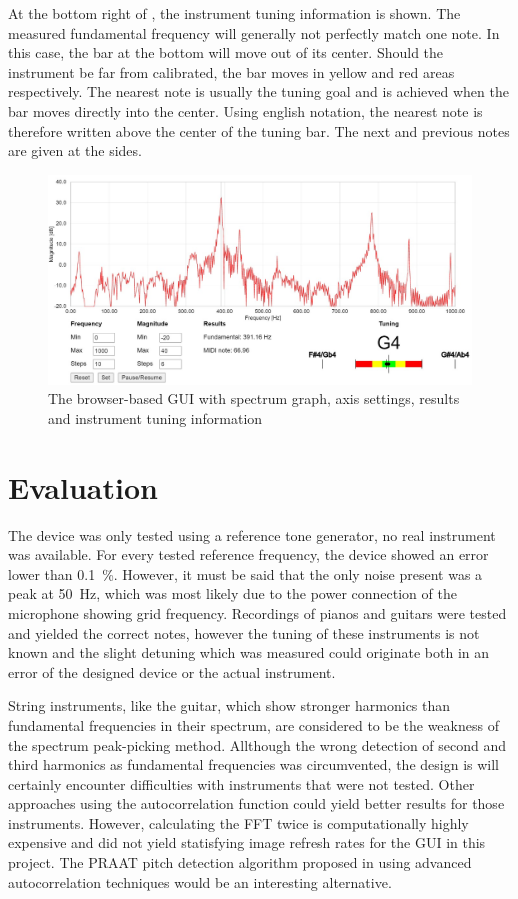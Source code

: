 \documentclass[a4paper, 12pt]{article}
\begin{document}
At the bottom right of , the instrument tuning information is shown. The measured fundamental frequency will generally not perfectly match one note. In this case, the bar at the bottom will move out of its center. Should the instrument be far from calibrated, the bar moves in yellow and red areas respectively. The nearest note is usually the tuning goal and is achieved when the bar moves directly into the center. Using english notation, the nearest note is therefore written above the center of the tuning bar. The next and previous notes are given at the sides.

\begin{figure}[h!]
	\centering
	\includegraphics[width=\textwidth]{gui-all.jpg}
	\caption{The browser-based GUI with spectrum graph, axis settings, results and instrument tuning information}
	\label{fig:gui-all}
\end{figure}

\section{Evaluation}
The device was only tested using a reference tone generator, no real instrument was available. For every tested reference frequency, the device showed an error lower than \SI{0.1}{\percent}. However, it must be said that the only noise present was a peak at \SI{50}{\hertz}, which was most likely due to the power connection of the microphone showing grid frequency. Recordings of pianos and guitars were tested and yielded the correct notes, however the tuning of these instruments is not known and the slight detuning which was measured could originate both in an error of the designed device or the actual instrument.

String instruments, like the guitar, which show stronger harmonics than fundamental frequencies in their spectrum, are considered to be the weakness of the spectrum peak-picking method. Allthough the wrong detection of second and third harmonics as fundamental frequencies was circumvented, the design is will certainly encounter difficulties with instruments that were not tested. Other approaches using the autocorrelation function could yield better results for those instruments. However, calculating the FFT twice is computationally highly expensive and did not yield statisfying image refresh rates for the GUI in this project. The PRAAT pitch detection algorithm proposed in \cite{Boersma93} using advanced autocorrelation techniques would be an interesting alternative.
\end{document}
